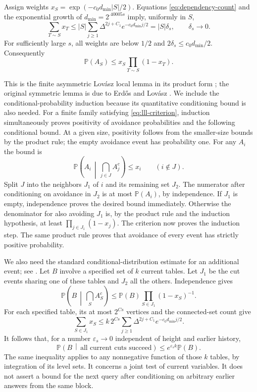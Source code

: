 Assign weights $x_S=\exp(-c_0d_{\min}|S|/2)$.  Equations
\eqref{eq:dependency-count} and the exponential growth of
$d_{\min}=2^{.40005s}$ imply, uniformly in $S$,
\[
 \sum_{T\sim S}x_T
 \leq |S|\sum_{j\geq1}\Delta^{2j+C_1}e^{-c_0d_{\min}j/2}
       =|S|\delta_s,\qquad\delta_s\longrightarrow0.
\]
For sufficiently large $s$, all weights are below $1/2$ and
$2\delta_s\leq c_0d_{\min}/2$.  Consequently
\begin{equation}\label{eq:lll-criterion}
 \mathbb P(A_S)\leq x_S\prod_{T\sim S}(1-x_T).
\end{equation}

This is the finite asymmetric Lov\'asz local lemma in its product form
\cite[Theorem~1.1]{MT10}; the original symmetric lemma is due to
Erd\H{o}s and Lov\'asz \cite[\S2]{EL75}. We include the conditional-probability
induction because its quantitative conditioning bound is also needed.  For a finite family
satisfying \eqref{eq:lll-criterion}, induction simultaneously proves
positivity of avoidance probabilities and the following conditional
bound.  At a given size, positivity follows from the smaller-size
bounds by the product rule; the empty avoidance event has probability
one.  For any $A_i$ the bound is
\[
 \mathbb P\left(A_i\,\middle|\,\bigcap_{j\in J}A_j^c\right)
       \leq x_i\qquad(i\notin J).
\]
Split $J$ into the neighbors $J_1$ of $i$ and its remaining set
$J_2$.  The numerator after conditioning on avoidance in $J_2$
is at most $\mathbb P(A_i)$, by independence.  If $J_1$ is empty,
independence proves the desired bound immediately.  Otherwise the denominator
for also avoiding $J_1$ is, by the product rule and the induction
hypothesis, at least $\prod_{j\in J_1}(1-x_j)$.  The criterion
now proves the induction step.  The same product rule proves
that avoidance of every event has strictly positive probability.

We also need the standard conditional-distribution estimate for an
additional event; see \cite[Theorem~2.1]{HSS11}.  Let $B$ involve
a specified set of $k$ current tables.  Let $J_1$ be the cut events
sharing one of these tables and $J_2$ all the others.  Independence
gives
\[
 \mathbb P\left(B\,\middle|\,\bigcap_S A_S^c\right)
 \leq\mathbb P(B)\prod_{S\in J_1}(1-x_S)^{-1}.
\]
For each specified table, its at most $2^{Cs}$ vertices and the
connected-set count give
\[
 \sum_{S\in J_1}x_S
 \leq k\,2^{Cs}\sum_{j\geq1}\Delta^{2j+C_1}
                          e^{-c_0d_{\min}j/2}.
\]
It follows that, for a number $\varepsilon_s\to0$ independent of
height and earlier history,
\begin{equation}\label{eq:current-event-inflation}
 \mathbb P\left(B\,\middle|\,\text{all current cuts succeed}\right)
       \leq e^{\varepsilon_s k}\mathbb P(B).
\end{equation}
The same inequality applies to any nonnegative function of those
$k$ tables, by integration of its level sets.  It concerns a joint
test of current variables.  It does not assert a bound for the
next query after conditioning on arbitrary earlier answers from
the same block.

